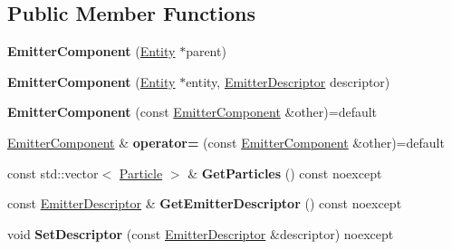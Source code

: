 \subsection*{Public Member Functions}
\begin{DoxyCompactItemize}
\item 
\mbox{\label{class_blade_1_1_emitter_component_a55cce6b7da93eaa1457bba292999a201}} 
{\bfseries Emitter\+Component} (\hyperlink{class_blade_1_1_entity}{Entity} $\ast$parent)
\item 
\mbox{\label{class_blade_1_1_emitter_component_a428197b942167146b95bc3d0faba0137}} 
{\bfseries Emitter\+Component} (\hyperlink{class_blade_1_1_entity}{Entity} $\ast$entity, \hyperlink{struct_blade_1_1_emitter_descriptor}{Emitter\+Descriptor} descriptor)
\item 
\mbox{\label{class_blade_1_1_emitter_component_a22e68608c870ea65bc40340bb34fd0e2}} 
{\bfseries Emitter\+Component} (const \hyperlink{class_blade_1_1_emitter_component}{Emitter\+Component} \&other)=default
\item 
\mbox{\label{class_blade_1_1_emitter_component_a1ab39fdf3f2931a81d16adc6d0238aa6}} 
\hyperlink{class_blade_1_1_emitter_component}{Emitter\+Component} \& {\bfseries operator=} (const \hyperlink{class_blade_1_1_emitter_component}{Emitter\+Component} \&other)=default
\item 
\mbox{\label{class_blade_1_1_emitter_component_aa3666e4962a9b7cf05fab173524eaac8}} 
const std\+::vector$<$ \hyperlink{struct_blade_1_1_particle}{Particle} $>$ \& {\bfseries Get\+Particles} () const noexcept
\item 
\mbox{\label{class_blade_1_1_emitter_component_a810d5dfde0f798d23625c0e671fe7848}} 
const \hyperlink{struct_blade_1_1_emitter_descriptor}{Emitter\+Descriptor} \& {\bfseries Get\+Emitter\+Descriptor} () const noexcept
\item 
\mbox{\label{class_blade_1_1_emitter_component_a93e1be16b0559bfbd02e537a5a51963a}} 
void {\bfseries Set\+Descriptor} (const \hyperlink{struct_blade_1_1_emitter_descriptor}{Emitter\+Descriptor} \&descriptor) noexcept

\end{DoxyCompactItemize}
